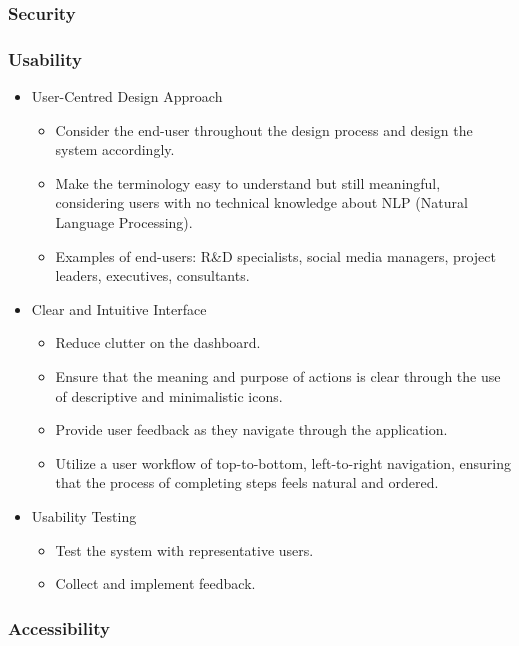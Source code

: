 \documentclass[12pt]{article}
\begin{document}
\subsubsection*{Security}

\subsubsection*{Usability}

\begin{itemize}
  \item User-Centred Design Approach
        \begin{itemize}
          \item Consider the end-user throughout the design process and design the system accordingly.
          \item Make the terminology easy to understand but still meaningful, considering users with no technical knowledge about NLP (Natural Language Processing).
          \item Examples of end-users: R\&D specialists, social media managers, project leaders, executives, consultants.
        \end{itemize}
  \item Clear and Intuitive Interface
        \begin{itemize}
          \item Reduce clutter on the dashboard.
          \item Ensure that the meaning and purpose of actions is clear through the use of descriptive and minimalistic icons.
          \item Provide user feedback as they navigate through the application.
          \item Utilize a user workflow of top-to-bottom, left-to-right navigation, ensuring that the process of completing steps feels natural and ordered.
        \end{itemize}
  \item Usability Testing
        \begin{itemize}
          \item Test the system with representative users.
          \item Collect and implement feedback.
        \end{itemize}
\end{itemize}

\subsubsection*{Accessibility}
\end{document}
